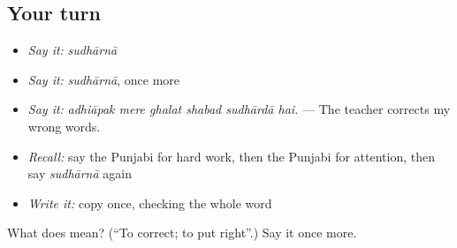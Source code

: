 \subsection*{Your turn}
\begin{itemize}
\raggedright
  \item \emph{Say it:} \emph{sudhārnā}
  \item \emph{Say it:} \emph{sudhārnā}, once more
  \item \emph{Say it:} \emph{adhiāpak mere ghalat shabad sudhārdā hai.} — The teacher corrects my wrong words.
  \item \emph{Recall:} say the Punjabi for hard work, then the Punjabi for attention, then say \emph{sudhārnā} again
  \item \emph{Write it:} copy \textbf{} once, checking the whole word
\end{itemize}

\begin{tcolorbox}[breakable,colback=teal!4,colframe=teal!35!black,title={Before you move on}]
What does  mean? (\textquotedblleft{}To correct; to put right\textquotedblright{}.) Say it once more.
\end{tcolorbox}
